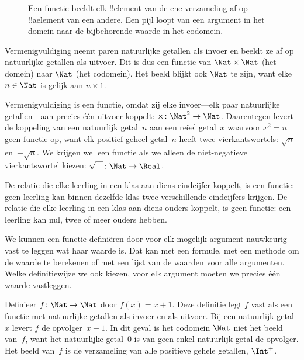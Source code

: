 \documentclass[openany]{memoir}
\begin{document}
\begin{figure}
  \caption{Een functie beeldt elk !!{element} van de ene verzameling af op
    !!a{element} van een andere. Een pijl loopt van een argument in het
    domein naar de bijbehorende waarde in het codomein.}
\end{figure}

\begin{ex}
Vermenigvuldiging neemt paren natuurlijke getallen als invoer en beeldt ze
af op natuurlijke getallen als uitvoer. Dit is dus een functie van
$\Nat \times \Nat$ (het domein) naar $\Nat$ (het codomein). Het beeld blijkt
ook $\Nat$ te zijn, want elke $n \in \Nat$ is gelijk aan $n \times 1$.
\end{ex}

\begin{ex}
Vermenigvuldiging is een functie, omdat zij elke invoer---elk paar natuurlijke
getallen---aan precies één uitvoer koppelt: $\times \colon \Nat^2 \to
\Nat$. Daarentegen levert de koppeling van een natuurlijk getal~$n$ aan een
reëel getal~$x$ waarvoor $x^2 = n$ geen functie op, want elk positief geheel
getal~$n$ heeft twee vierkantswortels: $\sqrt{n}$ en~$-\sqrt{n}$. We krijgen
wel een functie als we alleen de niet-negatieve vierkantswortel kiezen:
$\sqrt{\phantom{X}} \colon \Nat \to \Real$.
\end{ex}

\begin{ex}
De relatie die elke leerling in een klas aan diens eindcijfer koppelt, is een
functie: geen leerling kan binnen dezelfde klas twee verschillende eindcijfers
krijgen. De relatie die elke leerling in een klas aan diens ouders koppelt, is
geen functie: een leerling kan nul, twee of meer ouders hebben.
\end{ex}

\begin{explain}
We kunnen een functie definiëren door voor elk mogelijk argument nauwkeurig
vast te leggen wat haar waarde is. Dat kan met een formule, met een methode om
de waarde te berekenen of met een lijst van de waarden voor alle argumenten.
Welke definitiewijze we ook kiezen, voor elk argument moeten we precies één
waarde vastleggen.
\end{explain}


\begin{ex}
Definieer $f \colon \Nat \to \Nat$ door $f(x) = x+1$. Deze definitie legt
$f$ vast als een functie met natuurlijke getallen als invoer en als uitvoer.
Bij een natuurlijk getal~$x$ levert $f$ de opvolger~$x+1$.
In dit geval is het codomein $\Nat$ niet het beeld van~$f$, want het
natuurlijke getal~$0$ is van geen enkel natuurlijk getal de opvolger. Het
beeld van~$f$ is de verzameling van alle positieve gehele getallen,
$\Int^{+}$.
\end{ex}
\end{document}
